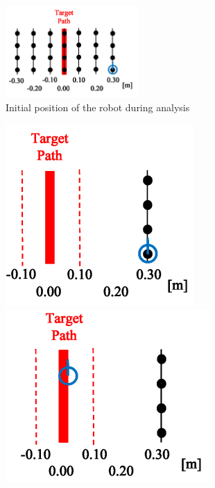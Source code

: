 \documentclass{jarticle}
\begin{document}
\begin{figure}[h!]
  \centering
   \includegraphics[height=35mm]{./figs/k.png}
   \caption{Initial position of the robot during analysis}
\end{figure}


\begin{figure}[htbp]
  \begin{minipage}[t]{0.5\linewidth}
    \centering
    \includegraphics[keepaspectratio, scale=0.31]{figs/init.png}
  \end{minipage}
  \begin{minipage}[t]{0.5\linewidth}
    \centering
    \includegraphics[keepaspectratio, scale=0.31]{figs/return.png}
  \end{minipage}\vspace*{2mm}
\vspace*{-2.5mm}

\end{figure}
\end{document}
